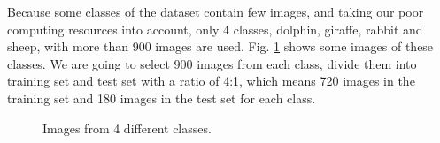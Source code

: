 \documentclass[conference]{IEEEtran}
\begin{document}
Because some classes of the dataset contain few images, and taking our poor computing resources into account, only 4 classes, dolphin, giraffe, rabbit and sheep, with more than 900 images are used. Fig. \ref{image} shows some images of these classes. We are going to select 900 images from each class, divide them into training set and test set with a ratio of 4:1, which means 720 images in the training set and 180 images in the test set for each class.
	\begin{figure}[H]
				\centering
				\caption{Images from 4 different classes.}\label{image}
			\end{figure}
\end{document}
